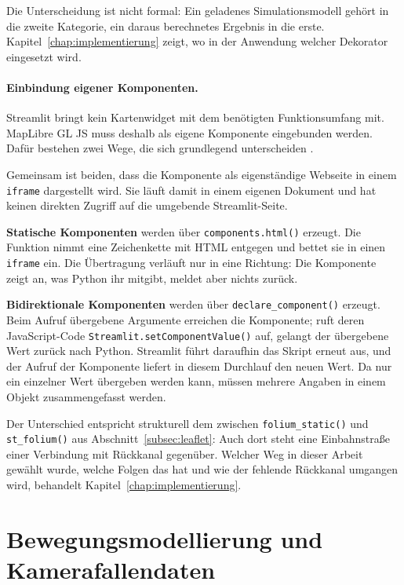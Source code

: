 \documentclass[12pt,a4paper]{report}
\begin{document}
Die Unterscheidung ist nicht formal: Ein geladenes Simulationsmodell gehört in die zweite
Kategorie, ein daraus berechnetes Ergebnis in die erste. Kapitel~\ref{chap:implementierung}
zeigt, wo in der Anwendung welcher Dekorator eingesetzt wird.

\paragraph{Einbindung eigener Komponenten.}
\label{par:komponenten}

Streamlit bringt kein Kartenwidget mit dem benötigten Funktionsumfang mit. MapLibre GL JS
muss deshalb als eigene Komponente eingebunden werden. Dafür bestehen zwei Wege, die sich
grundlegend unterscheiden \cite{StreamlitComponents}.

Gemeinsam ist beiden, dass die Komponente als eigenständige Webseite in einem
\texttt{iframe} dargestellt wird. Sie läuft damit in einem eigenen Dokument und hat keinen
direkten Zugriff auf die umgebende Streamlit-Seite.

\textbf{Statische Komponenten} werden über \texttt{components.html()} erzeugt. Die Funktion
nimmt eine Zeichenkette mit HTML entgegen und bettet sie in einen \texttt{iframe} ein. Die
Übertragung verläuft nur in eine Richtung: Die Komponente zeigt an, was Python ihr
mitgibt, meldet aber nichts zurück.

\textbf{Bidirektionale Komponenten} werden über \texttt{declare\_component()} erzeugt. Beim
Aufruf übergebene Argumente erreichen die Komponente; ruft deren JavaScript-Code
\texttt{Streamlit.setComponentValue()} auf, gelangt der übergebene Wert zurück nach
Python. Streamlit führt daraufhin das Skript erneut aus, und der Aufruf der Komponente
liefert in diesem Durchlauf den neuen Wert. Da nur ein einzelner Wert übergeben werden
kann, müssen mehrere Angaben in einem Objekt zusammengefasst werden.

Der Unterschied entspricht strukturell dem zwischen \texttt{folium\_static()} und
\texttt{st\_folium()} aus Abschnitt~\ref{subsec:leaflet}: Auch dort steht eine
Einbahnstraße einer Verbindung mit Rückkanal gegenüber. Welcher Weg in dieser Arbeit
gewählt wurde, welche Folgen das hat und wie der fehlende Rückkanal umgangen wird,
behandelt Kapitel~\ref{chap:implementierung}.

\section{Bewegungsmodellierung und Kamerafallendaten}
\label{sec:fachliche-grundlagen}
\end{document}
